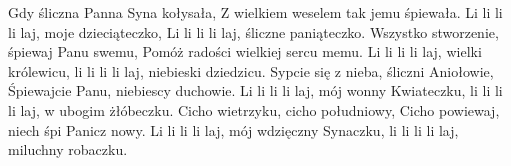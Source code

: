 \beginverse
Gdy śliczna Panna Syna kołysała,
Z wielkiem weselem tak jemu śpiewała.
Li li li li laj, moje dzieciąteczko,
Li li li li laj, śliczne paniąteczko.
\endverse
\beginverse
Wszystko stworzenie, śpiewaj Panu swemu,
Pomóż radości wielkiej sercu memu.
Li li li li laj, wielki królewicu,
li li li li laj, niebieski dziedzicu.
\endverse
\beginverse
Sypcie się z nieba, śliczni Aniołowie,
Śpiewajcie Panu, niebiescy duchowie.
Li li li li laj, mój wonny Kwiateczku,
li li li li laj, w ubogim żłóbeczku.
\endverse
\beginverse
Cicho wietrzyku, cicho południowy,
Cicho powiewaj, niech śpi Panicz nowy.
Li li li li laj, mój wdzięczny Synaczku,
li li li li laj, miluchny robaczku.
\endverse
\endsong
